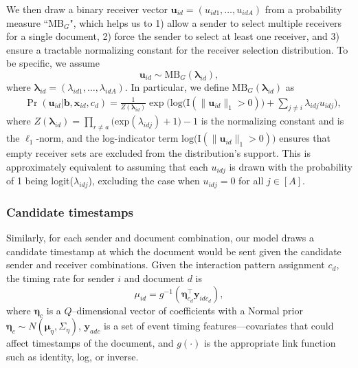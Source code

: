 \documentclass[ba]{imsart}
\numberwithin{equation}{section}
\theoremstyle{plain}
\begin{document}
	We then draw a binary receiver vector $\boldsymbol{u}_{id}= (u_{id1},
	\ldots, u_{idA})$ from a probability measure ``MB$_{G}$", which helps us to 1) allow a sender to select multiple receivers for a single document, 2) force the sender to select at least one receiver, and 3) ensure a tractable normalizing constant for the receiver selection distribution. To be specific, we assume
	\begin{equation} \boldsymbol{u}_{id}  \sim
		\mbox{MB}_{G}(\boldsymbol{\lambda}_{id}),
	\end{equation}
	where $\boldsymbol{\lambda}_{id}= (\lambda_{id1},\ldots,\lambda_{idA})$. In particular, we define $\mbox{MB}_{G}(\boldsymbol{\lambda}_{id})$ as
	\begin{equation}
		\begin{aligned}
			&\Pr(\boldsymbol{u}_{id}|\boldsymbol{b}, \boldsymbol{x}_{id}, c_d) = \frac{1}{Z(\boldsymbol{\lambda}_{id})}\exp\Big(\mbox{log}\big(\text{I}( \lVert \boldsymbol{u}_{id}\rVert_1 > 0 )\big) + \sum_{j\neq i} \lambda_{idj}u_{idj}\Big) ,
		\end{aligned}
		\label{eqn:Gibbs}
	\end{equation}
	where $Z(\boldsymbol{\lambda}_{id})= \prod_{r \neq a} \big(\mbox{exp}(\lambda_{idj}) + 1\big)-1$ is the normalizing constant and is the $\ell_1$-norm, and the log-indicator term $\mbox{log}\big(\text{I}( \lVert \boldsymbol{u}_{id}\rVert_1 > 0 )\big)$ ensures that empty receiver sets are excluded from the distribution's support. This is approximately equivalent to assuming that each $u_{idj}$ is drawn with the probability of 1 being logit($\lambda_{idj}$), excluding the case when $u_{idj}=0$ for all $j \in [A]$.
	
	\subsubsection{Candidate timestamps}\label{subsubsec:Time}
	Similarly, for each sender and document combination, our model draws a candidate timestamp at which the document would be sent given the candidate sender and receiver combinations. Given the interaction pattern assignment $c_d$, the timing rate for sender $i$ and document $d$ is
	\begin{equation}
		\mu_{id} = g^{-1}(\boldsymbol{\eta}_{c_d}^\top \boldsymbol{y}_{idc_d}),
	\end{equation}
	where $\boldsymbol{\eta}_c$ is a $Q$--dimensional vector of coefficients with a Normal prior $\boldsymbol{\eta}_c \sim N(\boldsymbol{\mu}_\eta,\Sigma_\eta)$, $\boldsymbol{y}_{adc}$ is a set of event timing features---covariates that could affect timestamps of the document, and $g(\cdot)$ is the appropriate link function such as identity, log, or inverse. 
	
\end{document}
